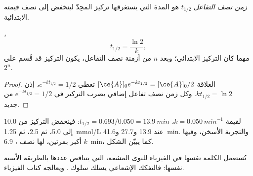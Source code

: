 \begin{definition}\label{def:g12:reaction-rates:half-life}
\emph{زمن نصف التفاعل} $t_{1/2}$ هو المدة
التي يستغرقها تركيز  المحِدّ لينخفض إلى نصف
قيمته الابتدائية.
\end{definition}

\begin{proposition}\label{prop:g12:reaction-rates:half-life}
،
\[
  t_{1/2} = \frac{\ln 2}{k},
\]
مهما كان التركيز الابتدائي؛ وبعد $n$ من أزمنة نصف التفاعل، يكون
التركيز قد قُسم على $2^n$.
\end{proposition}

\begin{proof}
العلاقة $[\ce{A}]_0 e^{-k t_{1/2}} = [\ce{A}]_0 / 2$ تعطي $e^{-k t_{1/2}} = 1/2$،
إذن $k t_{1/2} = \ln 2$. وكل زمن نصف تفاعل إضافي يضرب
التركيز في $e^{-k t_{1/2}} = 1/2$ من جديد.
\end{proof}


\begin{example}\label{ex:g12:reaction-rates:half-lives}
لقيمة $k = \qty{0.050}{min^{-1}}$، $t_{1/2} = 0.693 / 0.050 =
\qty{13.9}{min}$: فينخفض التركيز من 10.0 إلى 5.0، ثم 2.5،
ثم \qty{1.25}{mmol/L} عند 13.9 و27.7 و\qty{41.6}{min}. والتجربة الأسخن،
وفيها $k$ أكبر بمرتين، لها نصف ، \qty{6.9}{min}، كما
يبيّن الشكل.
\end{example}

\begin{remark}\label{rem:g12:reaction-rates:radioactive}
تُستعمل الكلمة نفسها في الفيزياء للنوى المشعة، التي يتناقص عددها
بالطريقة الأسية نفسها: فالتفكك الإشعاعي يسلك سلوك
. ويعالجه كتاب الفيزياء.
\end{remark}

